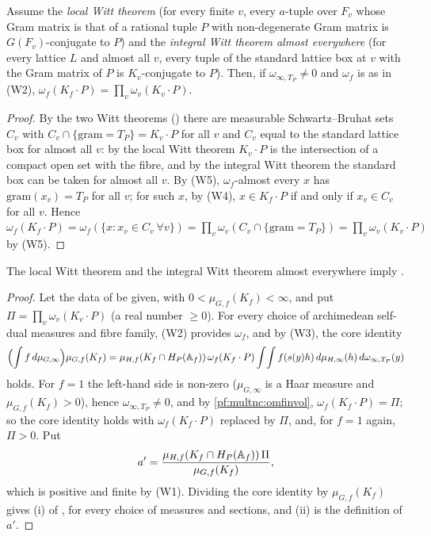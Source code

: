\begin{lemma}\label{pf:multnc:omfinvol}
Assume the \emph{local Witt theorem} (for every finite $v$, every $a$-tuple over $F_v$ whose Gram matrix is that of a rational
tuple $P$ with non-degenerate Gram matrix is $G(F_v)$-conjugate to $P$) and the \emph{integral Witt theorem almost
everywhere} (for every lattice $L$ and almost all $v$, every tuple of the standard lattice box at $v$ with the Gram matrix of
$P$ is $K_v$-conjugate to $P$). Then, if $\omega_{\infty,T_P}\ne0$ and $\omega_f$ is as in (W2),
$\omega_f(K_f\cdot P)=\prod_v\omega_v(K_v\cdot P)$.
\end{lemma}

\begin{proof}
By the two Witt theorems () there are measurable Schwartz--Bruhat sets
$C_v$ with $C_v\cap\{\mathrm{gram}=T_P\}=K_v\cdot P$ for all $v$ and $C_v$ equal to the standard lattice box for almost all
$v$: by the local Witt theorem $K_v\cdot P$ is the intersection of a compact open set with the fibre, and by the integral
Witt theorem the standard box can be taken for almost all $v$. By (W5), $\omega_f$-almost every $x$ has
$\mathrm{gram}(x_v)=T_P$ for all $v$; for such $x$, by (W4), $x\in K_f\cdot P$ if and only if $x_v\in C_v$ for all $v$. Hence
$\omega_f(K_f\cdot P)=\omega_f(\{x:x_v\in C_v\ \forall v\})=\prod_v\omega_v(C_v\cap\{\mathrm{gram}=T_P\})=
\prod_v\omega_v(K_v\cdot P)$ by (W5).
\end{proof}

\begin{theorem}\label{pf:multnc:splitwitt}
The local Witt theorem and the integral Witt theorem almost everywhere imply .
\end{theorem}

\begin{proof}
Let the data of  be given, with $0<\mu_{G,f}(K_f)<\infty$, and put $\Pi=\prod_v\omega_v(K_v\cdot P)$ (a real
number $\ge0$). For every choice of archimedean self-dual measures and fibre family, (W2) provides $\omega_f$, and by (W3),
the core identity
\[
\Bigl(\int f\,d\mu_{G,\infty}\Bigr)\mu_{G,f}(K_f)=\mu_{H,f}(K_f\cap H_P(\mathbb{A}_{f}))\,\omega_f(K_f\cdot P)\int\!\int f(s(y)h)\,
d\mu_{H,\infty}(h)\,d\omega_{\infty,T_P}(y)
\]
holds. For $f=1$ the left-hand side is non-zero ($\mu_{G,\infty}$ is a Haar measure and $\mu_{G,f}(K_f)>0$), hence
$\omega_{\infty,T_P}\ne0$, and by \cref{pf:multnc:omfinvol}, $\omega_f(K_f\cdot P)=\Pi$; so the core identity holds with
$\omega_f(K_f\cdot P)$ replaced by $\Pi$, and, for $f=1$ again, $\Pi>0$. Put
\[
a'=\frac{\mu_{H,f}(K_f\cap H_P(\mathbb{A}_{f}))\,\Pi}{\mu_{G,f}(K_f)},
\]
which is positive and finite by (W1). Dividing the core identity by $\mu_{G,f}(K_f)$ gives (i) of , for every
choice of measures and sections, and (ii) is the definition of $a'$.
\end{proof}

